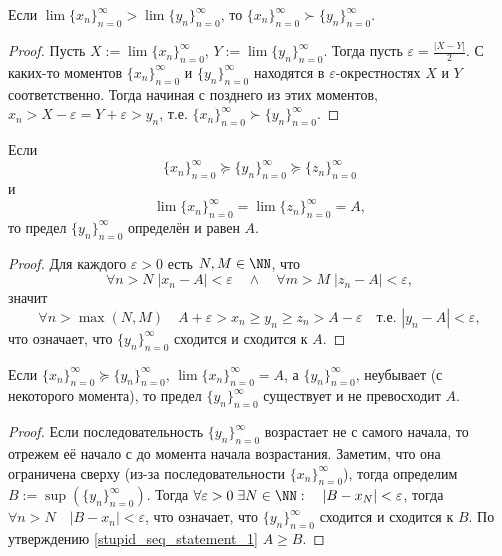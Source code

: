 \documentclass[12pt,a4paper]{article}
\begin{document}
    \begin{statement}\label{stupid_seq_statement_2}
        Если $\lim \{x_n\}_{n=0}^\infty > \lim \{y_n\}_{n=0}^\infty$, то $\{x_n\}_{n=0}^\infty \succ \{y_n\}_{n=0}^\infty$.
    \end{statement}

    \begin{proof}
        Пусть $X := \lim \{x_n\}_{n=0}^\infty$, $Y := \lim \{y_n\}_{n=0}^\infty$. Тогда пусть $\varepsilon = \frac{|X - Y|}{2}$. С каких-то моментов $\{x_n\}_{n=0}^\infty$ и $\{y_n\}_{n=0}^\infty$ находятся в $\varepsilon$-окрестностях $X$ и $Y$ соответственно. Тогда начиная с позднего из этих моментов, $x_n > X - \varepsilon = Y + \varepsilon > y_n$, т.е. $\{x_n\}_{n=0}^\infty \succ \{y_n\}_{n=0}^\infty$.
    \end{proof}

    \begin{statement}\label{stupid_seq_statement_3}
        Если
        \[\{x_n\}_{n=0}^\infty \succcurlyeq \{y_n\}_{n=0}^\infty \succcurlyeq \{z_n\}_{n=0}^\infty\]
        и
        \[\lim \{x_n\}_{n=0}^\infty = \lim \{z_n\}_{n=0}^\infty = A,\]
        то предел $\{y_n\}_{n=0}^\infty$ определён и равен $A$.
    \end{statement}

    \begin{proof}
        Для каждого $\varepsilon > 0$ есть $N, M \in \NN$, что
        \[\forall n > N\; |x_n - A| < \varepsilon \quad \wedge \quad \forall m > M\; |z_n - A| < \varepsilon,\]
        значит
        \[\forall n > \max(N, M)\quad A + \varepsilon > x_n \geqslant y_n \geqslant z_n > A - \varepsilon \quad \text{т.е. } |y_n - A| < \varepsilon,\]
        что означает, что $\{y_n\}_{n=0}^\infty$ сходится и сходится к $A$.
    \end{proof}

    \begin{statement}
        Если $\{x_n\}_{n=0}^\infty \succcurlyeq \{y_n\}_{n=0}^\infty$, $\lim \{x_n\}_{n=0}^\infty = A$, а $\{y_n\}_{n=0}^\infty$, неубывает (с некоторого момента), то предел $\{y_n\}_{n=0}^\infty$ существует и не превосходит $A$.
    \end{statement}

    \begin{proof}
        Если последовательность $\{y_n\}_{n=0}^\infty$ возрастает не с самого начала, то отрежем её начало с до момента начала возрастания. Заметим, что она ограничена сверху (из-за последовательности $\{x_n\}_{n=0}^\infty$), тогда определим $B := \sup(\{y_n\}_{n=0}^\infty)$. Тогда $\forall \varepsilon > 0\; \exists N \in \NN:\quad |B-x_N| < \varepsilon$, тогда $\forall n > N\quad |B-x_n| < \varepsilon$, что означает, что $\{y_n\}_{n=0}^\infty$ сходится и сходится к $B$. По утверждению \ref{stupid_seq_statement_1} $A \geqslant B$.
    \end{proof}
\end{document}
